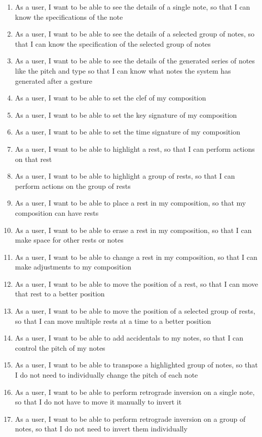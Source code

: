 \begin{enumerate}
\item As a user, I want to be able to see the details of a single note, so that I can know the specifications of the note
\item As a user, I want to be able to see the details of a selected group of notes, so that I can know the specification of the selected group of notes
\item As a user, I want to be able to see the details of the generated series of notes like the pitch and type so that I can know what notes the system has generated after a gesture
\item As a user, I want to be able to set the clef of my composition
\item As a user, I want to be able to set the key signature of my composition
\item As a user, I want to be able to set the time signature of my composition
\item As a user, I want to be able to highlight a rest, so that I can perform actions on that rest
\item As a user, I want to be able to highlight a group of rests, so that I can perform actions on the group of rests
\item As a user, I want to be able to place a rest in my composition, so that my composition can have rests
\item As a user, I want to be able to erase a rest in my composition, so that I can make space for other rests or notes
\item As a user, I want to be able to change a rest in my composition, so that I can make adjustments to my composition
\item As a user, I want to be able to move the position of a rest, so that I can move that rest to a better position
\item As a user, I want to be able to move the position of a selected group of rests, so that I can move multiple rests at a time to a better position
\item As a user, I want to be able to add accidentals to my notes, so that I can control the pitch of my notes
\item As a user, I want to be able to transpose a highlighted group of notes, so that I do not need to individually change the pitch of each note
\item As a user, I want to be able to perform retrograde inversion on a single note, so that I do not have to move it manually to invert it
\item As a user, I want to be able to perform retrograde inversion on a group of notes, so that I do not need to invert them individually

\end{enumerate}

